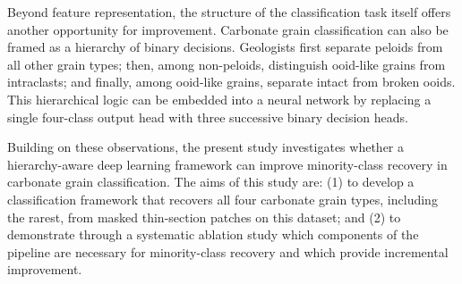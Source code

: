 \documentclass[a4paper,fleqn]{cas-dc}
\begin{document}
Beyond feature representation, the structure of the classification task itself offers another opportunity for improvement. Carbonate grain classification can also be framed as a hierarchy of binary decisions. Geologists first separate peloids from all other grain types; then, among non-peloids, distinguish ooid-like grains from intraclasts; and finally, among ooid-like grains, separate intact from broken ooids. This hierarchical logic can be embedded into a neural network by replacing a single four-class output head with three successive binary decision heads.

Building on these observations, the present study investigates whether a hierarchy-aware deep learning framework can improve minority-class recovery in carbonate grain classification. The aims of this study are: (1) to develop a classification framework that recovers all four carbonate grain types, including the rarest, from masked thin-section patches on this dataset; and (2) to demonstrate through a systematic ablation study which components of the pipeline are necessary for minority-class recovery and which provide incremental improvement.

\end{document}
